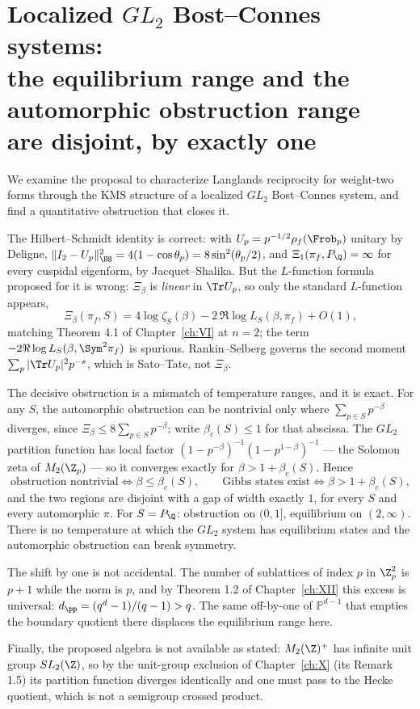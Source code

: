 \chapter[The gap is exactly one]{Localized $GL_2$ Bost--Connes systems:\\ the equilibrium range and the automorphic obstruction range\\ are disjoint, by exactly one}\label{ch:XXI}
\begin{summary}
We examine the proposal to characterize Langlands reciprocity for weight-two forms through
the $\mathrm{KMS}$ structure of a localized $GL_2$ Bost--Connes system, and find a
quantitative obstruction that closes it.

The Hilbert--Schmidt identity is correct: with $U_p=p^{-1/2}\rho_f(\Frob_p)$ unitary by
Deligne, $\|I_2-U_p\|_\HS^2=4(1-\cos\theta_p)=8\sin^2(\theta_p/2)$, and
$\Xi_1(\pi_f,P_\Q)=\infty$ for every cuspidal eigenform, by Jacquet--Shalika. But the
$L$-function formula proposed for it is wrong: $\Xi_\beta$ is \emph{linear} in $\Tr U_p$, so
only the standard $L$-function appears,
\[
\Xi_\beta(\pi_f,S)=4\log\zeta_S(\beta)-2\,\Re\log L_S(\beta,\pi_f)+O(1),
\]
matching Theorem 4.1 of Chapter~\ref{ch:VI} at $n=2$; the term
$-2\Re\log L_S(\beta,\Sym^2\pi_f)$ is
spurious. Rankin--Selberg governs the second moment $\sum_p|\Tr U_p|^2p^{-s}$, which is
Sato--Tate, not $\Xi_\beta$.

The decisive obstruction is a mismatch of temperature ranges, and it is exact. For any
$S$, the automorphic obstruction can be nontrivial only where $\sum_{p\in S}p^{-\beta}$
diverges, since $\Xi_\beta\le8\sum_{p\in S}p^{-\beta}$; write $\beta_c(S)\le1$ for that
abscissa. The $GL_2$ partition function has local factor
$(1-p^{-\beta})^{-1}(1-p^{1-\beta})^{-1}$ --- the Solomon zeta of $M_2(\Z_p)$ --- so it
converges exactly for $\beta>1+\beta_c(S)$. Hence
\[
\text{obstruction nontrivial}\iff\beta\le\beta_c(S),
\qquad
\text{Gibbs states exist}\iff\beta>1+\beta_c(S),
\]
and the two regions are disjoint with a gap of width exactly $1$, for every $S$ and every
automorphic $\pi$. For $S=P_\Q$: obstruction on $(0,1]$, equilibrium on $(2,\infty)$. There is
no temperature at which the $GL_2$ system has equilibrium states and the automorphic
obstruction can break symmetry.

The shift by one is not accidental. The number of sublattices of index $p$ in $\Z_p^2$ is
$p+1$ while the norm is $p$, and by Theorem 1.2 of Chapter~\ref{ch:XII} this excess is universal:
$d_\pp=(q^d-1)/(q-1)>q$. The same off-by-one of $\mathbb P^{d-1}$ that empties the boundary
quotient there displaces the equilibrium range here.

Finally, the proposed algebra is not available as stated: $M_2(\Z)^+$ has infinite unit group
$SL_2(\Z)$, so by the unit-group exclusion of Chapter~\ref{ch:X} (its Remark 1.5) its partition function
diverges identically and one
must pass to the Hecke quotient, which is not a semigroup crossed product.
\end{summary}


